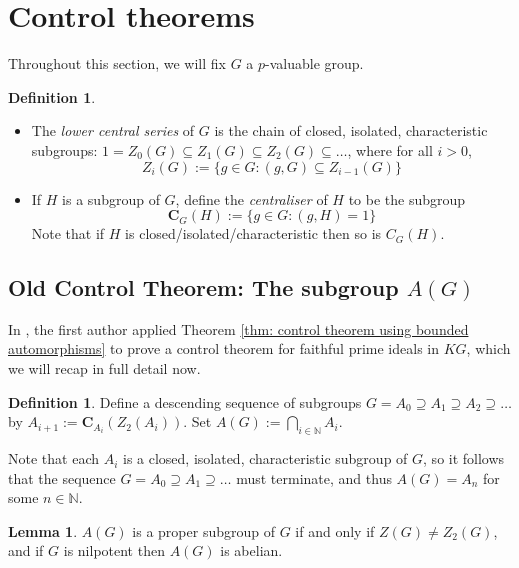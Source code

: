 \documentclass[12pt,a4paper]{article}
\theoremstyle{definition}
\newtheorem{lem}[thm]{Lemma}
\newtheorem{defn}[thm]{Definition}
\theoremstyle{remark}
\theoremstyle{custthm}
\begin{document}

\section{Control theorems}\label{sec: control theorem}

Throughout this section, we will fix $G$ a $p$-valuable group.

\begin{defn} $ $
\begin{itemize}
    \item The \emph{lower central series} of $G$ is the chain of closed, isolated, characteristic subgroups: $1=Z_0(G)\subseteq Z_1(G)\subseteq Z_2(G)\subseteq\dots$, where for all $i>0$, $$Z_i(G):=\{g\in G:(g,G)\subseteq Z_{i-1}(G)\}$$

    \item If $H$ is a subgroup of $G$, define the \emph{centraliser} of $H$ to be the subgroup $$\mathbf{C}_G(H):=\{g\in G:(g,H)=1\}$$ Note that if $H$ is closed/isolated/characteristic then so is $C_G(H)$.
\end{itemize}
\end{defn}

\subsection{Old Control Theorem: The subgroup $A(G)$}

In \cite[section 3]{jones-primitive-ideals}, the first author applied Theorem \ref{thm: control theorem using bounded automorphisms} to prove a control theorem for faithful prime ideals in $KG$, which we will recap in full detail now.

\begin{defn}\label{defn: A-groups}
Define a descending sequence of subgroups $G=A_0 \supseteq A_1\supseteq A_2\supseteq\dots$ by $A_{i+1} := \mathbf{C}_{A_{i}}(Z_2(A_i))$. Set $A(G) := \bigcap_{i\in\mathbb{N}} A_i$.
\end{defn}

Note that each $A_i$ is a closed, isolated, characteristic subgroup of $G$, so it follows that the sequence $G=A_0\supseteq A_1\supseteq\dots$ must terminate, and thus $A(G)=A_n$ for some $n\in\mathbb{N}$.

\begin{lem}\label{lem: properties of A}
$A(G)$ is a proper subgroup of $G$ if and only if $Z(G)\neq Z_2(G)$, and if $G$ is nilpotent then $A(G)$ is abelian.
\end{lem}
\end{document}
